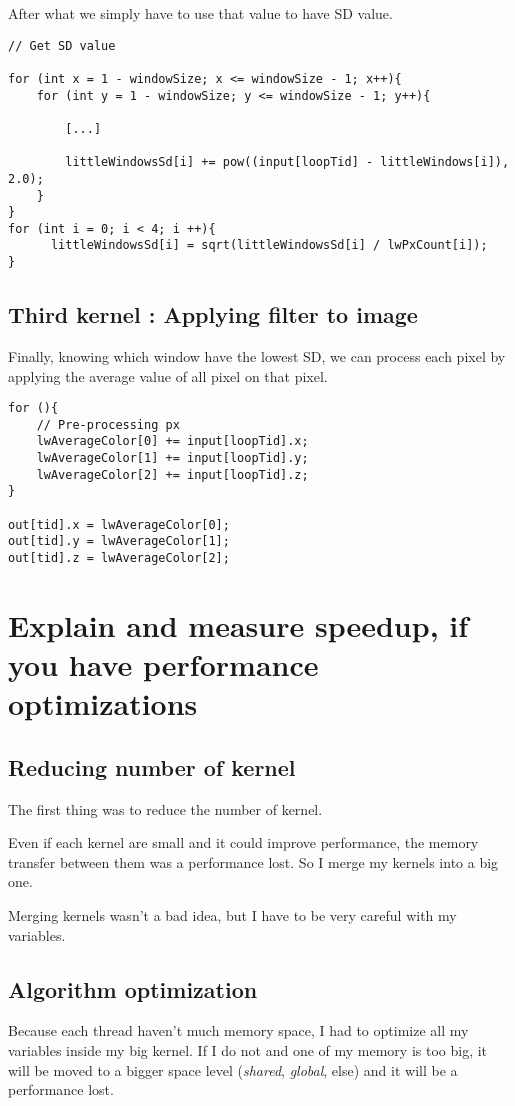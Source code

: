 \documentclass[11pt]{article} %
\begin{document}
After what we simply have to use that value to have SD value.

\begin{lstlisting}[style=CStyle]
// Get SD value

for (int x = 1 - windowSize; x <= windowSize - 1; x++){
	for (int y = 1 - windowSize; y <= windowSize - 1; y++){
		
		[...]

        littleWindowsSd[i] += pow((input[loopTid] - littleWindows[i]), 2.0);
	}
}
for (int i = 0; i < 4; i ++){
      littleWindowsSd[i] = sqrt(littleWindowsSd[i] / lwPxCount[i]);
}
\end{lstlisting}

\subsection{Third kernel : Applying filter to image}

Finally, knowing which window have the lowest SD, we can process each pixel by applying the average value of all pixel on that pixel.

\begin{lstlisting}[style=CStyle]
for (){
    // Pre-processing px
    lwAverageColor[0] += input[loopTid].x;
    lwAverageColor[1] += input[loopTid].y;
    lwAverageColor[2] += input[loopTid].z;	
}

out[tid].x = lwAverageColor[0];
out[tid].y = lwAverageColor[1];
out[tid].z = lwAverageColor[2];
\end{lstlisting}

\section{Explain and measure speedup, if you have performance optimizations}

\subsection{Reducing number of kernel}

The first thing was to reduce the number of kernel.

Even if each kernel are small and it could improve performance, the memory transfer between them was a performance lost. So I merge my kernels into a big one.

Merging kernels wasn't a bad idea, but I have to be very careful with my variables.

\subsection{Algorithm optimization}

Because each thread haven't much memory space, I had to optimize all my variables inside my big kernel. If I do not and one of my memory is too big, it will be moved to a bigger space level ({\it shared}, {\it global}, else) and it will be a performance lost.
\end{document}
